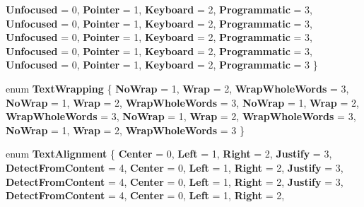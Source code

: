 \begin{DoxyCompactItemize}
{\bfseries Unfocused} = 0, 
{\bfseries Pointer} = 1, 
{\bfseries Keyboard} = 2, 
{\bfseries Programmatic} = 3, 
\newline
{\bfseries Unfocused} = 0, 
{\bfseries Pointer} = 1, 
{\bfseries Keyboard} = 2, 
{\bfseries Programmatic} = 3, 
\newline
{\bfseries Unfocused} = 0, 
{\bfseries Pointer} = 1, 
{\bfseries Keyboard} = 2, 
{\bfseries Programmatic} = 3, 
\newline
{\bfseries Unfocused} = 0, 
{\bfseries Pointer} = 1, 
{\bfseries Keyboard} = 2, 
{\bfseries Programmatic} = 3, 
\newline
{\bfseries Unfocused} = 0, 
{\bfseries Pointer} = 1, 
{\bfseries Keyboard} = 2, 
{\bfseries Programmatic} = 3
 \}
\item 
\mbox{\label{namespace_windows_1_1_u_i_1_1_xaml_aa8ebfd3700e5b390858676152a8a58e9}} 
enum {\bfseries Text\+Wrapping} \{ \newline
{\bfseries No\+Wrap} = 1, 
{\bfseries Wrap} = 2, 
{\bfseries Wrap\+Whole\+Words} = 3, 
{\bfseries No\+Wrap} = 1, 
\newline
{\bfseries Wrap} = 2, 
{\bfseries Wrap\+Whole\+Words} = 3, 
{\bfseries No\+Wrap} = 1, 
{\bfseries Wrap} = 2, 
\newline
{\bfseries Wrap\+Whole\+Words} = 3, 
{\bfseries No\+Wrap} = 1, 
{\bfseries Wrap} = 2, 
{\bfseries Wrap\+Whole\+Words} = 3, 
\newline
{\bfseries No\+Wrap} = 1, 
{\bfseries Wrap} = 2, 
{\bfseries Wrap\+Whole\+Words} = 3
 \}
\item 
\mbox{\label{namespace_windows_1_1_u_i_1_1_xaml_a096a1b0a726ae821c5a11e30eb861b63}} 
enum {\bfseries Text\+Alignment} \{ \newline
{\bfseries Center} = 0, 
{\bfseries Left} = 1, 
{\bfseries Right} = 2, 
{\bfseries Justify} = 3, 
\newline
{\bfseries Detect\+From\+Content} = 4, 
{\bfseries Center} = 0, 
{\bfseries Left} = 1, 
{\bfseries Right} = 2, 
\newline
{\bfseries Justify} = 3, 
{\bfseries Detect\+From\+Content} = 4, 
{\bfseries Center} = 0, 
{\bfseries Left} = 1, 
\newline
{\bfseries Right} = 2, 
{\bfseries Justify} = 3, 
{\bfseries Detect\+From\+Content} = 4, 
{\bfseries Center} = 0, 
\newline
{\bfseries Left} = 1, 
{\bfseries Right} = 2, 

\end{DoxyCompactItemize}
